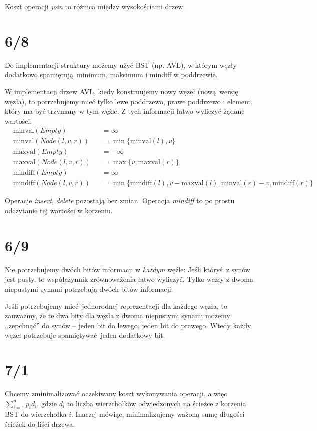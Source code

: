 \documentclass[a4paper, 12pt]{article}
\newcommand{\+}{\enspace}
\begin{document}

Koszt operacji \textit{join} to różnica między wysokościami drzew.

\section*{6/8}
Do implementacji struktury możemy użyć BST (np. AVL),
w którym węzły dodatkowo spamiętują minimum, maksimum i mindiff w poddrzewie.

W implementacji drzew AVL, kiedy konstruujemy nowy węzeł (nową wersję węzła),
to potrzebujemy mieć tylko lewe poddrzewo, prawe poddrzewo i element,
który ma być trzymany w tym węźle.
Z tych informacji łatwo wyliczyć żądane wartości:
\begin{align*}
	&\mathrm{minval}(\textit{Empty}) &&= ∞ \\
	&\mathrm{minval}(\textit{Node}(l, v, r)) &&= \min \{ \mathrm{minval}(l), v \} \\
	&\mathrm{maxval}(\textit{Empty}) &&= -∞ \\
	&\mathrm{maxval}(\textit{Node}(l, v, r)) &&= \max \{ v, \mathrm{maxval}(r) \} \\
	&\mathrm{mindiff}(\textit{Empty}) &&= ∞ \\
	&\mathrm{mindiff}(\textit{Node}(l, v, r)) &&=
		\min \{
			\mathrm{mindiff}(l),
			v - \mathrm{maxval}(l),
			\mathrm{minval}(r) - v,
			\mathrm{mindiff}(r)
		\}
\end{align*}

Operacje \textit{insert}, \textit{delete} pozostają bez zmian.
Operacja \textit{mindiff} to po prostu odczytanie tej wartości w korzeniu.

\section*{6/9}
Nie potrzebujemy dwóch bitów informacji w \textit{każdym} węźle:
Jeśli któryś z synów jest pusty, to współczynnik zrównoważenia łatwo wyliczyć.
Tylko wezły z dwoma niepustymi synami potrzebują dwóch bitów informacji.

Jeśli potrzebujemy mieć jednorodnej reprezentacji dla każdego węzła, to
zauważmy, że te dwa bity dla węzła z dwoma niepustymi synami możemy ,,zepchnąć''
do synów -- jeden bit do lewego, jeden bit do prawego.
Wtedy każdy węzeł potrzebuje spamiętywać jeden dodatkowy bit.

\section*{7/1}
Chcemy zminimalizować oczekiwany koszt wykonywania operacji,
a więc $∑_{i=1}^n p_i d_i$, gdzie $d_i$ to liczba wierzchołków odwiedzonych
na ścieżce z korzenia BST do wierzchołka $i$.
Inaczej mówiąc, minimalizujemy ważoną sumę długości ścieżek do liści drzewa.
\end{document}
